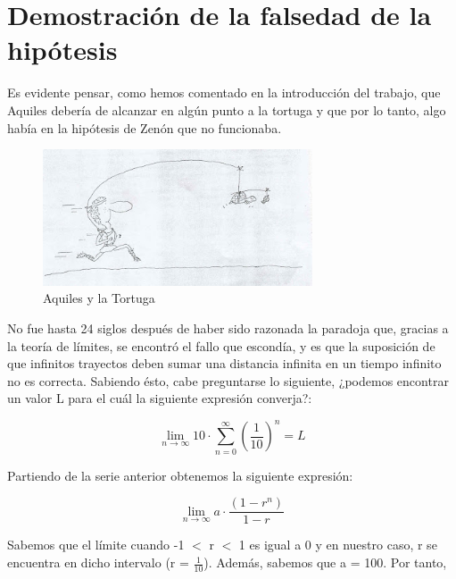 \documentclass[a4paper,12pt]{article}
\begin{document}
   \section{Demostración de la falsedad de la hipótesis}
   
   Es evidente pensar, como hemos comentado en la introducción del trabajo, que Aquiles
   debería de alcanzar en algún punto a la tortuga y que por lo tanto, algo había
   en la hipótesis de Zenón que no funcionaba. 
   
   \begin{figure}[h]
   \begin{center}
   \includegraphics[width=8cm]{Imagenes/aquiles-tortuga.jpg}
   \end{center}
   \caption{Aquiles y la Tortuga}
   \label{fig:aquiles1}
   \end{figure} 
    
   \newpage
   
   No fue hasta 24 siglos después de haber sido razonada la paradoja que, 
   gracias a la teoría de límites, se encontró el fallo que escondía,
   y es que la suposición de que infinitos trayectos deben sumar una distancia infinita en 
   un tiempo infinito no es correcta. Sabiendo ésto, cabe preguntarse lo siguiente,      
   ¿podemos encontrar un valor L para el cuál la siguiente expresión converja?: 
   
   \begin{equation}
   \lim\limits_{n \rightarrow \infty} 10 \cdot \sum_{n=0}^\infty (\frac{1}{10})^n = L
   \end{equation}   
   
   Partiendo de la serie anterior obtenemos la siguiente expresión:
   
   \begin{equation}
   \lim\limits_{n \rightarrow \infty} a \cdot \frac{(1 - r^n)}{1 - r}
   \end{equation}
   
   Sabemos que el límite cuando -1 $<$ r $<$ 1 es igual a 0 y en nuestro caso, r se encuentra en
   dicho intervalo (r = $\frac{1}{10}$). Además, sabemos que a = 100. Por tanto, 
   
\end{document}

